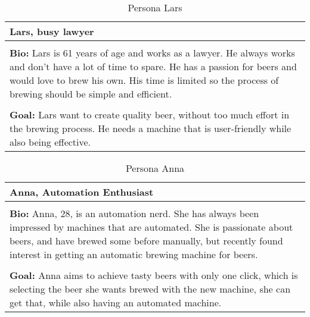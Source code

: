 \begin{table}[htb]
    \begin{center}
        \begin{tabular}{|p{16cm}|}
            \hline
            \textbf{Lars, busy lawyer}                                                                                                                                           \\
            \hline
            \\ \textbf{Bio:} Lars is 61 years of age and works as a lawyer. He always works and don't have a lot of time to spare. He has a passion for beers and would love to brew his own. His time is limited so the process of brewing should be simple and efficient.  \\
            \\
            \textbf{Goal:} Lars want to create quality beer, without too much effort in the brewing process. He needs a machine that is user-friendly while also being effective. \\
            \hline
        \end{tabular}
        \caption{Persona Lars}
        \label{tab:persona_lars}
    \end{center}
\end{table}

\begin{table}[htb]
    \begin{center}
        \begin{tabular}{|p{16cm}|}
            \hline
            \textbf{Anna, Automation Enthusiast}                                                                                                                                                              \\
            \hline
            \\ \textbf{Bio:} Anna, 28, is an automation nerd. She has always been impressed by machines that are automated. She is passionate about beers, and have brewed some before manually, but recently found interest in getting an automatic brewing machine for beers.  \\
            \\
            \textbf{Goal:} Anna aims to achieve tasty beers with only one click, which is selecting the beer she wants brewed with the new machine, she can get that, while also having an automated machine. \\
            \hline
        \end{tabular}
        \caption{Persona Anna}
        \label{tab:persona_anna}
    \end{center}
\end{table}

